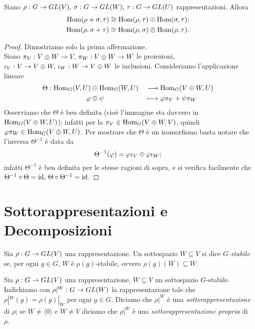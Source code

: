 \begin{proposition}
Siano $\rho:G\to GL(V),\,\allowbreak\sigma:G\to GL(W),\,\allowbreak\tau:G\to GL(U)$ rappresentazioni. Allora
\begin{align*}
\operatorname{Hom}(\rho+\sigma,\tau)\cong\operatorname{Hom}(\rho,\tau)\oplus\operatorname{Hom}(\sigma,\tau);\\
\operatorname{Hom}(\rho,\sigma+\tau)\cong\operatorname{Hom}(\rho,\sigma)\oplus\operatorname{Hom}(\rho,\tau).
\end{align*}
\end{proposition}
\begin{proof}
Dimostriamo solo la prima affermazione.\\
Siano $\pi_V:V\oplus W\to V,\,\allowbreak\pi_W:V\oplus W\to W$ le proiezioni, $\iota_V:V\to V\oplus W,\,\allowbreak\iota_W:W\to V\oplus W$ le inclusioni. Consideriamo l'applicazione lineare
\begin{alignat*}{2}
\Theta:\operatorname{Hom}_G(V,U)&\oplus\operatorname{Hom}_G(W,U)&&\longrightarrow\operatorname{Hom}_G(V\oplus W,U)\\
\varphi&\oplus\psi&&\longmapsto\varphi\pi_V+\psi\pi_W
\end{alignat*}
Osserviamo che $\Theta$ è ben definita (cioè l'immagine sta davvero in $\operatorname{Hom}_G(V\oplus W,U)$): infatti per la  $\pi_V\in\operatorname{Hom}_G(V\oplus W,V)$, quindi $\varphi\pi_W\in\operatorname{Hom}_G(V\oplus W,U)$. Per mostrare che $\Theta$ è un isomorfismo basta notare che l'inversa $\Theta^{-1}$ è data da
$$
\Theta^{-1}(\varphi)=\varphi\iota_V\oplus\varphi\iota_W;
$$
infatti $\Theta^{-1}$ è ben definita per le stesse ragioni di sopra, e si verifica facilmente che $\Theta^{-1}\circ\Theta=\operatorname{id},\,\allowbreak\Theta\circ\Theta^{-1}=\operatorname{id}$.
\end{proof}

\section{Sottorappresentazioni e Decomposizioni}

\begin{definition}
Sia $\rho:G\to GL(V)$ una rappresentazione. Un sottospazio $W\subseteq V$ si dice \emph{$G$-stabile} se, per ogni $g\in G$, $W$ è $\rho(g)$-stabile, ovvero $\rho(g)(W)\subseteq W$.
\end{definition}

\begin{definition}
Sia $\rho:G\to GL(V)$ una rappresentazione, $W\subseteq V$ un sottospazio $G$-stabile. Indichiamo con $\rho|^W:G\to GL(W)$ la rappresentazione tale che $\rho|^W(g)=\rho(g)|_W$ per ogni $g\in G$. Diciamo che $\rho|^W$ è una \emph{sottorappresentazione} di $\rho$; se $W\neq\langle0\rangle$ e $W\neq V$ diciamo che $\rho|^W$ è una \emph{sottorappresentazione propria} di $\rho$.
\end{definition}

